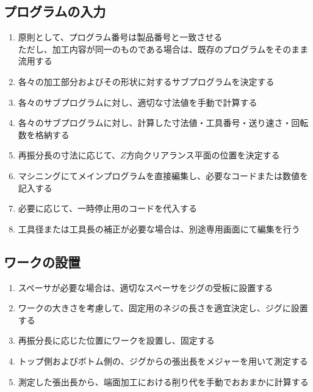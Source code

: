 \subsection{プログラムの入力}
\begin{enumerate}
\item 原則として、プログラム番号は製品番号と一致させる\\
ただし、加工内容が同一のものである場合は、既存のプログラムをそのまま流用する
\item 各々の加工部分およびその形状に対するサブプログラムを決定する
\item 各々のサブプログラムに対し、適切な寸法値を手動で計算する
\item 各々のサブプログラムに対し、計算した寸法値・工具番号・送り速さ・回転数を格納する
\item 再振分長の寸法に応じて、$Z$方向クリアランス平面の位置を決定する
\item マシニングにてメインプログラムを直接編集し、必要なコードまたは数値を記入する
\item 必要に応じて、一時停止用のコードを代入する
\item 工具径または工具長の補正が必要な場合は、別途専用画面にて編集を行う
\end{enumerate}


\subsection{ワークの設置}
\begin{enumerate}
\item スペーサが必要な場合は、適切なスペーサをジグの受板に設置する
\item ワークの大きさを考慮して、固定用のネジの長さを適宜決定し、ジグに設置する
\item 再振分長に応じた位置にワークを設置し、固定する
\item トップ側およびボトム側の、ジグからの張出長をメジャーを用いて測定する
\item 測定した張出長から、端面加工における削り代を手動でおおまかに計算する
\end{enumerate}


